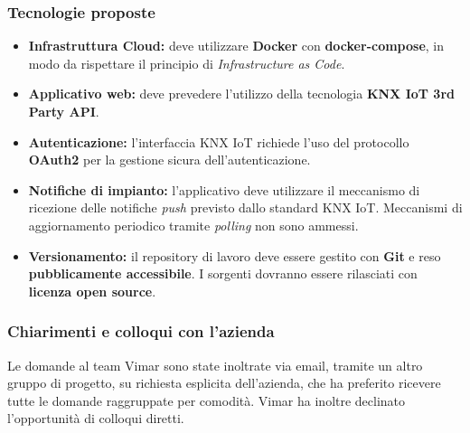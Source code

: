 \documentclass[a4paper,11pt]{article}
\begin{document}
\subsubsection{Tecnologie proposte}
\begin{itemize}
 \item \textbf{Infrastruttura Cloud:} deve utilizzare \textbf{Docker} con \textbf{docker-compose}, in modo da rispettare il principio di \textit{Infrastructure as Code}.
 \item \textbf{Applicativo web:} deve prevedere l'utilizzo della tecnologia \textbf{KNX IoT 3rd Party API}.
 \item \textbf{Autenticazione:} l'interfaccia KNX IoT richiede l'uso del protocollo \textbf{OAuth2} per la gestione sicura dell'autenticazione.
 \item \textbf{Notifiche di impianto:} l'applicativo deve utilizzare il meccanismo di ricezione delle notifiche \textit{push} previsto dallo standard KNX IoT. 
 Meccanismi di aggiornamento periodico tramite \textit{polling} non sono ammessi.
 \item \textbf{Versionamento:} il repository di lavoro deve essere gestito con \textbf{Git} e reso \textbf{pubblicamente accessibile}. 
 I sorgenti dovranno essere rilasciati con \textbf{licenza open source}.
\end{itemize}

\subsubsection{Chiarimenti e colloqui con l'azienda}
Le domande al team Vimar sono state inoltrate via email, tramite un altro gruppo di progetto, su richiesta esplicita dell'azienda, che ha preferito ricevere tutte le domande raggruppate per comodità. Vimar ha inoltre declinato l'opportunità di colloqui diretti.
\end{document}

